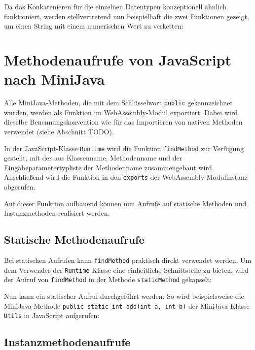 Da das Konkatenieren für die einzelnen Datentypen konzeptionell ähnlich funktioniert, werden stellvertretend nun beispielhaft die zwei Funktionen gezeigt, um einen String mit einem numerischen Wert zu verketten:


\section{Methodenaufrufe von JavaScript nach MiniJava}

Alle MiniJava-Methoden, die mit dem Schlüsselwort \lstinline{public} gekennzeichnet wurden, werden als Funktion im WebAssembly-Modul exportiert. Dabei wird dieselbe Benennungskonvention wie für das Importieren von nativen Methoden verwendet (siehe Abschnitt TODO).

In der JavaScript-Klasse \lstinline{Runtime} wird die Funktion \lstinline{findMethod} zur Verfügung gestellt, mit der aus Klassenname, Methodenname und der Eingabeparametertypliste der Methodenname zusammengebaut wird. Anschließend wird die Funktion in den \lstinline{exports} der WebAssembly-Modulinstanz abgerufen.



Auf dieser Funktion aufbauend können nun Aufrufe auf statische Methoden und Instanzmethoden realisiert werden.

\subsection{Statische Methodenaufrufe}

Bei statischen Aufrufen kann \lstinline{findMethod} praktisch direkt verwendet werden. Um dem Verwender der \lstinline{Runtime}-Klasse eine einheitliche Schnittstelle zu bieten, wird der Aufruf von \lstinline{findMethod} in der Methode \lstinline{staticMethod} gekapselt:



Nun kann ein statischer Aufruf durchgeführt werden. So wird beispielsweise die Mini\-Java-Methode \lstinline{public static int add(int a, int b)} der MiniJava-Klasse \lstinline{Utils} in Java\-Script aufgerufen:



\subsection{Instanzmethodenaufrufe}


